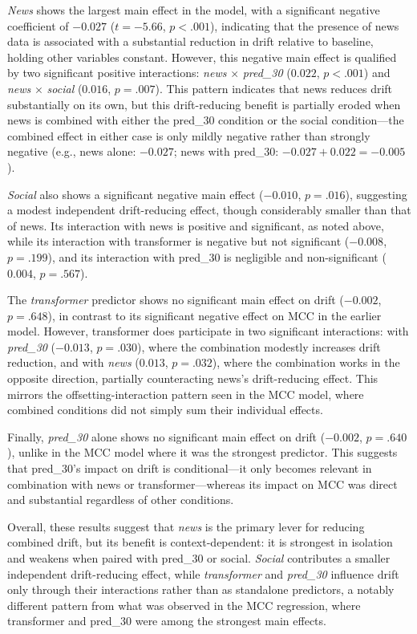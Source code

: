 \documentclass[stu,floatsintext]{apa7}
\begin{document}
\textit{News} shows the largest main effect in the model, with a significant negative coefficient of $-0.027$ ($t = -5.66$, $p < .001$), indicating that the presence of news data is associated with a substantial reduction in drift relative to baseline, holding other variables constant. However, this negative main effect is qualified by two significant positive interactions: \textit{news} $\times$ \textit{pred\_30} ($0.022$, $p < .001$) and \textit{news} $\times$ \textit{social} ($0.016$, $p = .007$). This pattern indicates that news reduces drift substantially on its own, but this drift-reducing benefit is partially eroded when news is combined with either the pred\_30 condition or the social condition---the combined effect in either case is only mildly negative rather than strongly negative (e.g., news alone: $-0.027$; news with pred\_30: $-0.027 + 0.022 = -0.005$).

\textit{Social} also shows a significant negative main effect ($-0.010$, $p = .016$), suggesting a modest independent drift-reducing effect, though considerably smaller than that of news. Its interaction with news is positive and significant, as noted above, while its interaction with transformer is negative but not significant ($-0.008$, $p = .199$), and its interaction with pred\_30 is negligible and non-significant ($0.004$, $p = .567$).

The \textit{transformer} predictor shows no significant main effect on drift ($-0.002$, $p = .648$), in contrast to its significant negative effect on MCC in the earlier model. However, transformer does participate in two significant interactions: with \textit{pred\_30} ($-0.013$, $p = .030$), where the combination modestly increases drift reduction, and with \textit{news} ($0.013$, $p = .032$), where the combination works in the opposite direction, partially counteracting news's drift-reducing effect. This mirrors the offsetting-interaction pattern seen in the MCC model, where combined conditions did not simply sum their individual effects.

Finally, \textit{pred\_30} alone shows no significant main effect on drift ($-0.002$, $p = .640$), unlike in the MCC model where it was the strongest predictor. This suggests that pred\_30's impact on drift is conditional---it only becomes relevant in combination with news or transformer---whereas its impact on MCC was direct and substantial regardless of other conditions.

Overall, these results suggest that \textit{news} is the primary lever for reducing combined drift, but its benefit is context-dependent: it is strongest in isolation and weakens when paired with pred\_30 or social. \textit{Social} contributes a smaller independent drift-reducing effect, while \textit{transformer} and \textit{pred\_30} influence drift only through their interactions rather than as standalone predictors, a notably different pattern from what was observed in the MCC regression, where transformer and pred\_30 were among the strongest main effects.
\end{document}
